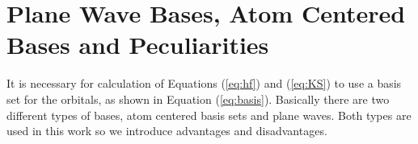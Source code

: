 \documentclass[11pt,DIV=13,BCOR=5mm,a4paper,headinclude]{scrbook}
\renewcommand{\vec}[1]{\underline{#1}}
\def\doubleunderline#1{\underline{\underline{#1}}}
\begin{document}
% 




\section{Plane Wave Bases, Atom Centered Bases and Peculiarities}
It is necessary for calculation of Equations (\ref{eq:hf}) and (\ref{eq:KS}) to use a basis set for the orbitals, as shown in Equation (\ref{eq:basis}).
Basically there are two different types of bases, atom centered basis sets and plane waves.
Both types are used in this work so we introduce advantages and disadvantages\cite{Tosoni2007}.
\end{document}
